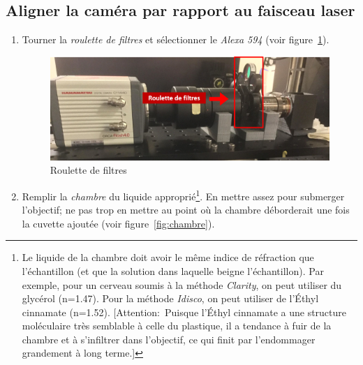 \subsection{Aligner la caméra par rapport au faisceau laser}
\label{ssec:aligner_la_cam}
\begin{enumerate}
    \item Tourner la \textit{roulette de filtres} et sélectionner le \textit{Alexa 594} (voir figure~\ref{fig:filtres}).
        \begin{figure}[H]
        \centering
        \includegraphics[width=15cm]{filtres.png}
        \caption{Roulette de filtres}
            \begin{footnotesize}  \end{footnotesize}
        \label{fig:filtres}
        \end{figure}
    \item Remplir la \textit{chambre} du liquide approprié\footnote{Le liquide de la chambre doit avoir le même indice de réfraction que l'échantillon (et que la solution dans laquelle beigne l'échantillon). Par exemple, pour un cerveau soumis à la méthode \textit{Clarity}, on peut utiliser du glycérol (n=1.47). Pour la méthode \textit{Idisco}, on peut utiliser de l'Éthyl cinnamate (n=1.52). [Attention:~Puisque l'Éthyl cinnamate a une structure moléculaire très semblable à celle du plastique, il a tendance à fuir de la chambre et à s'infiltrer dans l'objectif, ce qui finit par l'endommager grandement à long terme.]}. En mettre assez pour submerger l'objectif; ne pas trop en mettre au point où la chambre déborderait une fois la cuvette ajoutée (voir figure~\ref{fig:chambre}).

\end{enumerate}
